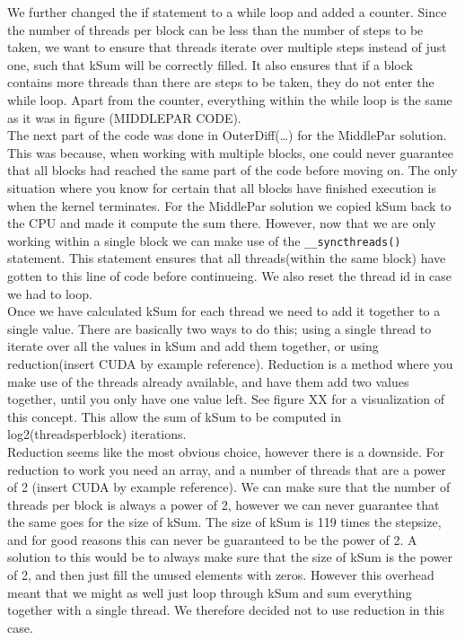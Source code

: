 We further changed the if statement to a while loop and added a counter. Since the number of threads per block can be less than the number of steps to be taken, we want to ensure that threads iterate over multiple steps instead of just one, such that kSum will be correctly filled. It also ensures that if a block contains more threads than there are steps to be taken, they do not enter the while loop. Apart from the counter, everything within the while loop is the same as it was in figure (MIDDLEPAR CODE).\\

The next part of the code was done in OuterDiff(…) for the MiddlePar solution. This was because, when working with multiple blocks, one could never guarantee that all blocks had reached the same part of the code before moving on. The only situation where you know for certain that all blocks have finished execution is when the kernel terminates. For the MiddlePar solution we copied kSum back to the CPU and made it compute the sum there. However, now that we are only working within a single block we can make use of the \texttt{\_\_syncthreads()} statement. This statement ensures that all threads(within the same block) have gotten to this line of code before continueing. We also reset the thread id in case we had to loop. \\

Once we have calculated kSum for each thread we need to add it together to a single value. There are basically two ways to do this; using a single thread to iterate over all the values in kSum and add them together, or using reduction(insert CUDA by example reference). Reduction is a method where you make use of the threads already available, and have them add two values together, until you only have one value left. See figure XX for a visualization of this concept. This allow the sum of kSum to be computed in log2(threadsperblock) iterations.\\

Reduction seems like the most obvious choice, however there is a downside. For reduction to work you need an array, and a number of threads that are a power of 2 (insert CUDA by example reference). We can make sure that the number of threads per block is always a power of 2, however we can never guarantee that the same goes for the size of kSum. The size of kSum is 119 times the stepsize, and for good reasons this can never be guaranteed to be the power of 2. A solution to this would be to always make sure that the size of kSum is the power of 2, and then just fill the unused elements with zeros. However this overhead meant that we might as well just loop through kSum and sum everything together with a single thread. We therefore decided not to use reduction in this case.\\

